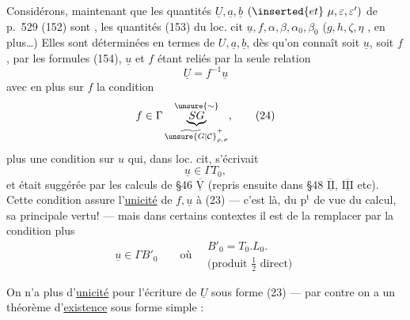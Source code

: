 Considérons, maintenant que les quantités $\underline U,\underline a,\underline b$ $(\inserted{et}\ \mu,\varepsilon,\varepsilon')$ de p.~529 (152) sont , les quantités (153) du loc. cit $\underline u,f,\alpha,\beta,\alpha_0,\beta_0$ ($g,h,\zeta,\eta$ , en plus\ldots) Elles sont déterminées en termes de $U,\underline a,\underline b$, dès qu'on connaît soit $\underline u$, soit $f$, par les formules (154), $\underline u$ et $f$ étant reliés par la seule relation
\[
\underline U=f^{-1}\underline u \tag{23}
\]
avec en plus sur $f$ la condition
\[
f\in\Gamma\underbrace{SG}_{\widetilde{\unsure{G|\mathcal C}}_{\rho,\sigma}^{+}}^{\unsure{\sim}},\tag{24}
\]
plus une condition sur $u$ qui, dans loc. cit, s'écrivait
\[
\underline u\in\Gamma T_0,\tag{25}
\]
et était suggérée par les calculs de \S46 $\overline{\underline{\mathrm V}}$ (repris ensuite dans \S48 $\overline{\underline{\mathrm{II}}}$, $\overline{\underline{\mathrm{III}}}$ etc). Cette condition assure l'\uline{unicité} de $f,\underline u$  à (23) --- c'est là, du $\mathrm p^{\mathrm t}$ de vue du calcul, sa principale vertu! --- mais dans certains contextes il est  de la remplacer par la condition plus 
\[
\underline u\in\Gamma B'_0
\qquad\text{où}\quad
\begin{gathered}
B'_0=T_0.L_0.\\
\text{(produit }\tfrac12\text{ direct)}
\end{gathered}\tag{26}
\]



On n'a plus  d'\uline{unicité} pour l'écriture de $\underline U$ sous forme (23) --- par contre on a un théorème d'\uline{existence} sous forme simple :

